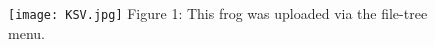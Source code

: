 \documentclass{article}
\begin{document}
	
	\begin{figure}
		\texttt{[image: KSV.jpg]}
		Figure 1: This frog was uploaded via the file-tree menu.
	\end{figure}
\end{document}
